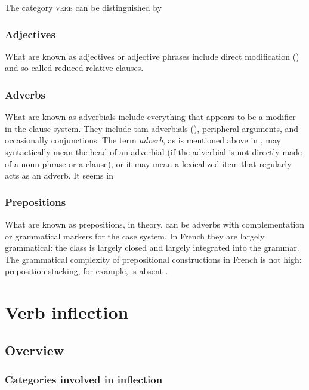 \documentclass[a4paper, oneside, 12pt]{report}
\newcommand*{\term}[1]{\emph{#1}}
\newcommand*{\category}[1]{\textsc{#1}}
\begin{document}
The category \category{verb} can be distinguished by 

\subsection{Adjectives}\label{sec:grammatical.pos.adjective}

What are known as adjectives or adjective phrases include direct modification
()
and so-called reduced relative clauses.

\subsection{Adverbs}

What are known as adverbials include everything that appears to be a modifier in the clause system.
They include \ac{tam} adverbials (),
peripheral arguments,
and occasionally conjunctions.
The term \term{adverb}, as is mentioned above in ,
may syntactically mean the head of an adverbial (if the adverbial is not directly made of a noun phrase or a clause),
or it may mean a lexicalized item that regularly acts as an adverb.
It seems in 

\subsection{Prepositions}

What are known as prepositions, in theory, can be adverbs with complementation
or grammatical markers for the case system.
In French they are largely grammatical:
the class is largely closed and largely integrated into the grammar.
The grammatical complexity of prepositional constructions in French is not high:
preposition stacking, for example, is absent .

\chapter{Verb inflection}

\section{Overview}

\subsection{Categories involved in inflection}\label{sec:verb-inflection.overview.categories}
\end{document}
